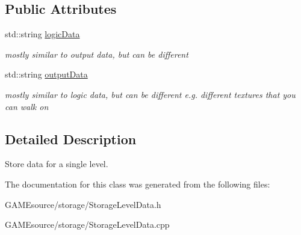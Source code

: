 \subsection*{Public Attributes}
\begin{DoxyCompactItemize}
\item 
\mbox{\label{class_storage_level_data_a18da07c7d59b3339d39a2ad5af2b5202}} 
std\+::string \mbox{\hyperlink{class_storage_level_data_a18da07c7d59b3339d39a2ad5af2b5202}{logic\+Data}}
\begin{DoxyCompactList}\small\item\em mostly similar to output data, but can be different \end{DoxyCompactList}\item 
\mbox{\label{class_storage_level_data_a1a8fbd497e6e534c4edeac01c641448c}} 
std\+::string \mbox{\hyperlink{class_storage_level_data_a1a8fbd497e6e534c4edeac01c641448c}{output\+Data}}
\begin{DoxyCompactList}\small\item\em mostly similar to logic data, but can be different e.\+g. different textures that you can walk on \end{DoxyCompactList}\end{DoxyCompactItemize}


\subsection{Detailed Description}
Store data for a single level. 

The documentation for this class was generated from the following files\+:\begin{DoxyCompactItemize}
\item 
G\+A\+M\+Esource/storage/Storage\+Level\+Data.\+h\item 
G\+A\+M\+Esource/storage/Storage\+Level\+Data.\+cpp\end{DoxyCompactItemize}
